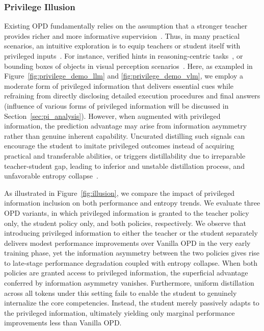 \documentclass[]{jingdong}
\theoremstyle{plain}
\theoremstyle{definition}
\theoremstyle{remark}
\begin{document}
\subsubsection{Privilege Illusion}
Existing OPD fundamentally relies on the assumption that a stronger teacher provides richer and more informative supervision~\citep{thinking2025opd,ko2025distillm}. 
Thus, in many practical scenarios, an intuitive exploration is to equip teachers or student itself with privileged inputs~\citep{song2026survey}. 
For instance, verified hints in reasoning-centric tasks~\citep{zhao2026self,penaloza2026privileged,hubotter2026reinforcement}, or bounding boxes of objects in visual perception scenarios~\citep{liu2026visual,yuan2026vision}.
Here, as exampled in Figure~\ref{fig:privilege_demo_llm} and \ref{fig:privilege_demo_vlm}, we employ a moderate form of privileged information that delivers essential cues while refraining from directly disclosing detailed execution procedures and final answers (influence of various forms of privileged information will be discussed in Section~\ref{sec:pi_analysis}).
However, when augmented with privileged information, the prediction advantage may arise from information asymmetry rather than genuine inherent capability. Uncurated distilling such signals can encourage the student to imitate privileged outcomes instead of acquiring practical and transferable abilities, or triggers distillability due to irreparable teacher-student gap, leading to inferior and unstable distillation process, and unfavorable entropy collapse~\citep{cui2025entropy,yu2026dapo}.




As illustrated in Figure~\ref{fig:illusion}, we compare the impact of privileged information inclusion on both performance  and entropy trends. We evaluate three OPD variants, in which privileged information is granted to the teacher policy only, the student policy only, and both policies, respectively. We observe that introducing privileged information to either the teacher or the student separately delivers modest performance improvements over Vanilla OPD in the very early training phase, yet the information asymmetry between the two policies gives rise to late-stage performance degradation coupled with entropy collapse. 
When both policies are granted access to privileged information, the superficial advantage conferred by information asymmetry vanishes. Furthermore, uniform distillation across all tokens under this setting fails to enable the student to genuinely internalize the core competencies. Instead, the student merely passively adapts to  the privileged information, ultimately yielding only marginal performance improvements less than Vanilla OPD.
\end{document}

